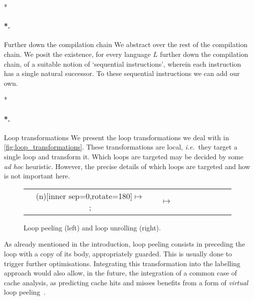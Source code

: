 \documentclass[submission,copyright,creativecommons]{eptcs}
\makeatletter
\theoremstyle{definition}
\newcommand{\ie}{\emph{i.e.\ }}
\let\oldparagraph\paragraph
\def\paragraph{\@ifnextchar*\new@paragraph@star\new@paragraph}
\def\new@paragraph@star*#1{\oldparagraph*{#1.}}
\def\new@paragraph#1{\oldparagraph{#1.}}
\makeatother
\begin{document}
\paragraph*{Further down the compilation chain}
We abstract over the rest of the compilation chain.
We posit the existence, for every language $L$ further down the compilation chain, of a suitable notion of `sequential instructions', wherein each instruction has a single natural successor. To these sequential instructions we can add our own.

\paragraph*{Loop transformations}
We present the loop transformations we deal with in \autoref{fig:loop_transformations}.
These transformations are local, \ie they target a single loop and transform it.
Which loops are targeted may be decided by some \emph{ad hoc} heuristic.
However, the precise details of which loops are targeted and how is not important here.
\begin{figure}
 \centering
\begin{tabular}{n*{5}{cn}}
&
\tikz[baseline={([yshift=-.5ex]n.mid)}]\node(n)[inner sep=0,rotate=180]{${}\mapsto{}$};
&
&
${}\mapsto{}$
&
\end{tabular}
\caption{Loop peeling (left) and loop unrolling (right).}
\label{fig:loop_transformations}
\end{figure}

As already mentioned in the introduction, loop peeling consists in preceding the loop with a copy of its body, appropriately guarded.
This is usually done to trigger further optimisations.
Integrating this transformation into the labelling approach would also allow, in the future, the integration of a common case of cache analysis, as predicting cache hits and misses benefits from a form of \emph{virtual} loop peeling~\cite{cacheprediction}.
\end{document}
